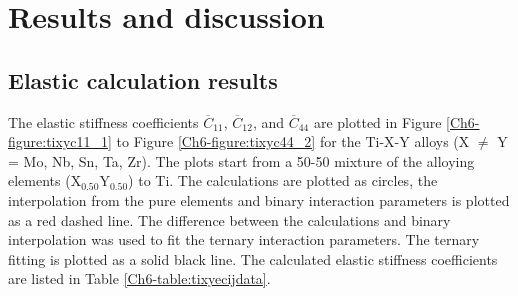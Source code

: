 \section{Results and discussion}

\subsection{Elastic calculation results}

The elastic stiffness coefficients $\overline{C}_{11}$, $\overline{C}_{12}$, and $\overline{C}_{44}$ are plotted in Figure \ref{Ch6-figure:tixyc11_1} to Figure \ref{Ch6-figure:tixyc44_2} for the Ti-X-Y alloys (X $\neq$ Y = Mo, Nb, Sn, Ta, Zr). The plots start from a 50-50 mixture of the alloying elements (X$_{0.50}$Y$_{0.50}$) to Ti. The calculations are plotted as circles, the interpolation from the pure elements and binary interaction parameters is plotted as a red dashed line. The difference between the calculations and binary interpolation was used to fit the ternary interaction parameters. The ternary fitting is plotted as a solid black line. The calculated elastic stiffness coefficients are listed in Table \ref{Ch6-table:tixyecijdata}.

